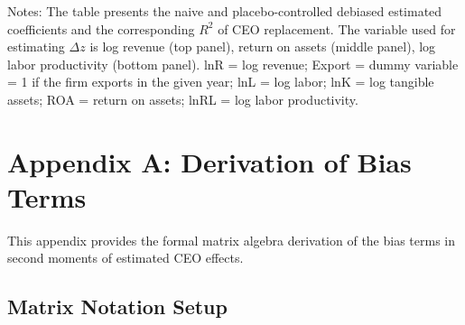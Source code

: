 \documentclass[11pt,a4paper]{article}
\newcommand{\tablepath}{papers/econometrics/table}
\begin{document}
\begin{table}[H]
    \centering
    \caption{Estimated Effect of CEO Change and $\text{R}^2$ -- Naive and Placebo-Controlled Debiased Methods }
    \vspace{.2cm}
    \label{tab:table_application}
    
    
    
    \begin{minipage}{16cm}
    \vspace{.2cm}
    \footnotesize{Notes: The table presents the naive and placebo-controlled debiased estimated coefficients and the corresponding $R^2$ of CEO replacement. The variable used for estimating $\Delta z$ is log revenue (top panel), return on assets (middle panel), log labor productivity (bottom panel). lnR = log revenue; Export = dummy variable = 1 if the firm exports in the given year; lnL = log labor; lnK = log tangible assets; ROA = return on assets; lnRL = log labor productivity.}
    \end{minipage}
\end{table}

\clearpage

\section*{Appendix A: Derivation of Bias Terms}\label{sec: appA}

\setcounter{equation}{0}
\renewcommand{\theequation}{A\arabic{equation}}

This appendix provides the formal matrix algebra derivation of the bias terms in second moments of estimated CEO effects.

\subsection{Matrix Notation Setup}
\end{document}
